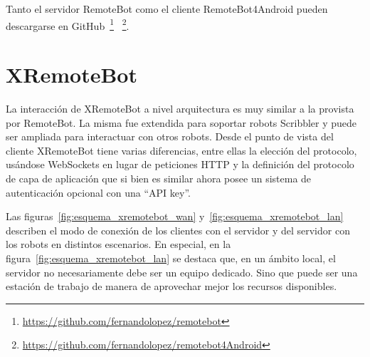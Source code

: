 Tanto el servidor RemoteBot como el cliente RemoteBot4Android pueden
descargarse en
GitHub~\footnote{\url{https://github.com/fernandolopez/remotebot}}%
~\footnote{\url{https://github.com/fernandolopez/remotebot4Android}}.

\section{XRemoteBot}\label{sec:xremotebot}

La interacción de XRemoteBot a nivel arquitectura es muy similar a la
provista por RemoteBot. La misma fue extendida para
soportar robots Scribbler y puede ser
ampliada para interactuar con otros robots. Desde el punto de vista del cliente
XRemoteBot tiene varias diferencias, entre ellas la elección del protocolo,
usándose WebSockets en lugar de peticiones HTTP y la definición del protocolo
de capa de aplicación que si bien es similar ahora posee un sistema de
autenticación opcional con una ``API key''.

Las
figuras~\ref{fig:esquema_xremotebot_wan} y~\ref{fig:esquema_xremotebot_lan}
describen el modo de conexión de los clientes con el servidor y del
servidor con los robots en distintos escenarios. En especial, en la
figura~\ref{fig:esquema_xremotebot_lan} se destaca que, en un ámbito
local, el servidor no necesariamente debe ser un equipo dedicado. Sino
que puede ser una estación de trabajo de manera de aprovechar mejor
los recursos disponibles.


